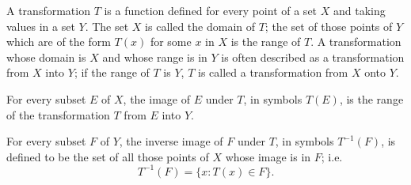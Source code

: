A transformation $T$ is a function defined for every point of a set $X$ and taking values in a set $Y$. The set $X$ is called the domain of $T$; the set of those points of $Y$ which are of the form $T(x)$ for some $x$ in $X$ is the range of $T$. A transformation whose domain is $X$ and whose range is in $Y$ is often described as a transformation from $X$ into $Y$; if the range of $T$ is $Y$, $T$ is called a transformation from $X$ onto $Y$.

For every subset $E$ of $X$, the image of $E$ under $T$, in symbols $T(E)$, is the range of the transformation $T$ from $E$ into $Y$.

For every subset $F$ of $Y$, the inverse image of $F$ under $T$, in symbols $T^{-1}(F)$, is defined to be the set of all those points of $X$ whose image is in $F$; i.e.
$$T^{-1}(F) = \{x: T(x) \in F\}.$$
